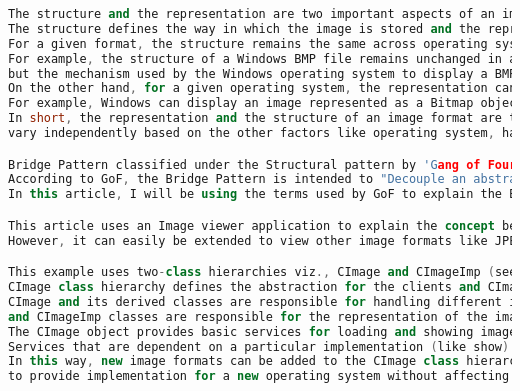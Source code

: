 \documentclass{book}
\begin{document}
\begin{lstlisting}[caption={Bridge Pattern sample code 2},label={lst:bridgepsc2},language=C++]
The structure and the representation are two important aspects of an image format.
The structure defines the way in which the image is stored and the representation deals with the display of the image.
For a given format, the structure remains the same across operating systems, whereas the representation or the way in which the image is displayed may vary between operating systems.
For example, the structure of a Windows BMP file remains unchanged in all operating systems,
but the mechanism used by the Windows operating system to display a BMP file is different from the one used by Macintosh or OS/2 operating systems to display the same file.
On the other hand, for a given operating system, the representation can remain unchanged across different image formats.
For example, Windows can display an image represented as a Bitmap object, without having to know about its source format which can be a BMP, a JPEG or a PCX.
In short, the representation and the structure of an image format are two different aspects and they should be allowed to 
vary independently based on the other factors like operating system, hardware etc.

Bridge Pattern classified under the Structural pattern by 'Gang of Four (GoF)' can be used to abstract and model these variations.
According to GoF, the Bridge Pattern is intended to "Decouple an abstraction from its implementation so that the two can vary independently".
In this article, I will be using the terms used by GoF to explain the Bridge Pattern.

This article uses an Image viewer application to explain the concept behind the Bridge Pattern. This sample application is designed to view BMP files on Windows operating systems.
However, it can easily be extended to view other image formats like JPEG on Windows or view BMP images on other operating systems like OS/2.

This example uses two-class hierarchies viz., CImage and CImageImp (see diagram).
CImage class hierarchy defines the abstraction for the clients and CImageImp class hierarchy provides implementation for the specified abstraction.
CImage and its derived classes are responsible for handling different image formats such as BMP, JPEG, PCX etc.,
and CImageImp classes are responsible for the representation of the images on different operating systems like Windows, OS/2.
The CImage object provides basic services for loading and showing images and it is configured with a CImageImp object.
Services that are dependent on a particular implementation (like show) are forwarded to CImageImp class (say to PaintImage).
In this way, new image formats can be added to the CImage class hierarchy without affecting the CImageImp and CImageImp can be extended
to provide implementation for a new operating system without affecting CImage. In short, the goal of the Bridge Pattern is achieved, that is, to vary abstraction and implementation independently.


\end{lstlisting}
\end{document}
